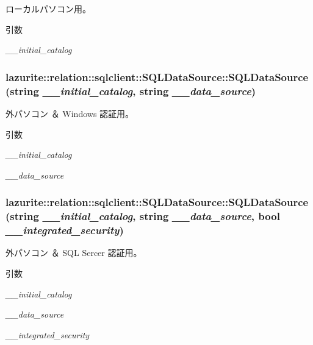 ローカルパソコン用。 
\begin{DoxyParams}{引数}
\item[{\em \_\-\_\-initial\_\-catalog}]\end{DoxyParams}
\hypertarget{classlazurite_1_1relation_1_1sqlclient_1_1_s_q_l_data_source_ad431353000e4dd1934ceb96b2cca46b8}{
\subsubsection[{SQLDataSource}]{\setlength{\rightskip}{0pt plus 5cm}lazurite::relation::sqlclient::SQLDataSource::SQLDataSource (string {\em \_\-\_\-initial\_\-catalog}, \/  string {\em \_\-\_\-data\_\-source})}}
\label{classlazurite_1_1relation_1_1sqlclient_1_1_s_q_l_data_source_ad431353000e4dd1934ceb96b2cca46b8}


外パソコン ＆ Windows 認証用。 
\begin{DoxyParams}{引数}
\item[{\em \_\-\_\-initial\_\-catalog}]\item[{\em \_\-\_\-data\_\-source}]\end{DoxyParams}
\hypertarget{classlazurite_1_1relation_1_1sqlclient_1_1_s_q_l_data_source_a9a0700de52851d929c639e774616cc9c}{
\subsubsection[{SQLDataSource}]{\setlength{\rightskip}{0pt plus 5cm}lazurite::relation::sqlclient::SQLDataSource::SQLDataSource (string {\em \_\-\_\-initial\_\-catalog}, \/  string {\em \_\-\_\-data\_\-source}, \/  bool {\em \_\-\_\-integrated\_\-security})}}
\label{classlazurite_1_1relation_1_1sqlclient_1_1_s_q_l_data_source_a9a0700de52851d929c639e774616cc9c}


外パソコン ＆ SQL Sercer 認証用。 
\begin{DoxyParams}{引数}
\item[{\em \_\-\_\-initial\_\-catalog}]\item[{\em \_\-\_\-data\_\-source}]\item[{\em \_\-\_\-integrated\_\-security}]\end{DoxyParams}


